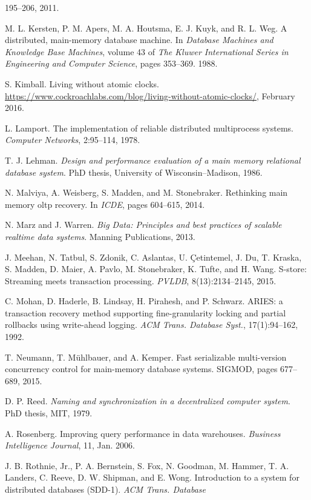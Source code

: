 \documentclass[a4paper,11pt,twoside,openright]{article}
\begin{document}
\begin{enumerate}[label={[}\arabic*{]}]
  195--206, 2011.
\item
  M. L. Kersten, P. M. Apers, M. A. Houtsma, E. J. Kuyk, and R. L. Weg.
  A distributed, main-memory database machine. In \emph{Database
  Machines and Knowledge Base Machines}, volume 43 of \emph{The Kluwer
  International Series in Engineering and Computer Science}, pages
  353--369. 1988.
\item
  S. Kimball. Living without atomic clocks.
  \url{https://www.cockroachlabs.com/blog/living-without-atomic-clocks/},
  February 2016.
\item
  L. Lamport. The implementation of reliable distributed multiprocess
  systems. \emph{Computer Networks}, 2:95--114, 1978.
\item
  T. J. Lehman. \emph{Design and performance evaluation of a main memory
  relational database system}. PhD thesis, University of
  Wisconsin--Madison, 1986.
\item
  N. Malviya, A. Weisberg, S. Madden, and M. Stonebraker. Rethinking
  main memory oltp recovery. In \emph{ICDE}, pages 604--615, 2014.
\item
  N. Marz and J. Warren. \emph{Big Data: Principles and best practices
  of scalable realtime data systems}. Manning Publications, 2013.
\item
  J. Meehan, N. Tatbul, S. Zdonik, C. Aslantas,
U. \c{C}etintemel, J. Du, T. Kraska, S. Madden, D. Maier,
A. Pavlo, M. Stonebraker, K. Tufte, and H. Wang. S-store: Streaming
meets transaction processing.
\emph{PVLDB}, 8(13):2134--2145, 2015.
\item
  C. Mohan, D. Haderle, B. Lindsay, H. Pirahesh, and P. Schwarz. ARIES:
  a transaction recovery method supporting fine-granularity locking and
  partial rollbacks using write-ahead logging. \emph{ACM Trans. Database
  Syst.}, 17(1):94--162, 1992.
\item
  T. Neumann, T. M\"{u}hlbauer, and A. Kemper. Fast serializable
  multi-version concurrency control for main-memory database systems.
  SIGMOD, pages 677--689, 2015.
\item
  D. P. Reed. \emph{Naming and synchronization in a decentralized
  computer system}. PhD thesis, MIT, 1979.
\item
  A. Rosenberg. Improving query performance in data warehouses.
  \emph{Business Intelligence Journal}, 11, Jan. 2006.
\item
  J. B. Rothnie, Jr., P. A. Bernstein, S. Fox, N. Goodman, M. Hammer, T.
  A. Landers, C. Reeve, D. W. Shipman, and E. Wong. Introduction to a
  system for distributed databases (SDD-1). \emph{ACM Trans. Database
}
\end{enumerate}
\end{document}
